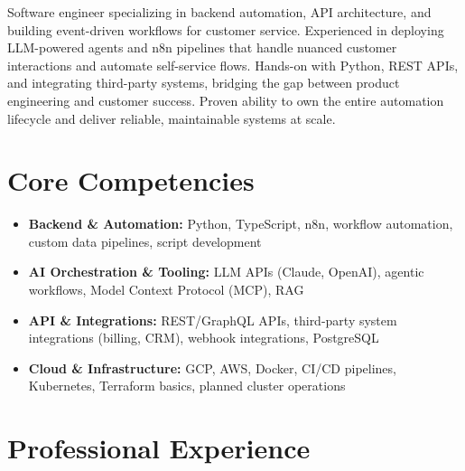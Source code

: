 \documentclass[11pt,a4paper,sans]{moderncv}
\begin{document}
\makecvtitle

\vspace{-15pt}
Software engineer specializing in backend automation, API architecture, and building event-driven workflows for customer service. Experienced in deploying LLM-powered agents and n8n pipelines that handle nuanced customer interactions and automate self-service flows. Hands-on with Python, REST APIs, and integrating third-party systems, bridging the gap between product engineering and customer success. Proven ability to own the entire automation lifecycle and deliver reliable, maintainable systems at scale.

\section{Core Competencies}
\vspace{1pt}
\begin{itemize}
\item \textbf{Backend \& Automation:} Python, TypeScript, n8n, workflow automation, custom data pipelines, script development
\item \textbf{AI Orchestration \& Tooling:} LLM APIs (Claude, OpenAI), agentic workflows, Model Context Protocol (MCP), RAG
\item \textbf{API \& Integrations:} REST/GraphQL APIs, third-party system integrations (billing, CRM), webhook integrations, PostgreSQL
\item \textbf{Cloud \& Infrastructure:} GCP, AWS, Docker, CI/CD pipelines, Kubernetes, Terraform basics, planned cluster operations
\end{itemize}

\section{Professional Experience}
\vspace{1pt}

\vspace{3pt}
\end{document}

